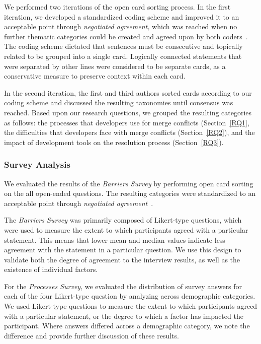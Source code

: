 We performed two iterations of the open card sorting process.
In the first iteration, we developed a standardized coding scheme and improved it to an acceptable point through \textit{negotiated agreement,} which was reached when no further thematic categories could be created and agreed upon by both coders~\cite{garrison2006revisiting,ritchie2013qualitative}.
The coding scheme dictated that sentences must be consecutive and topically related to be grouped into a single card.
Logically connected statements that were separated by other lines were considered to be separate cards, as a conservative measure to preserve context within each card.

In the second iteration, the first and third authors sorted cards according to our coding scheme and discussed the resulting taxonomies until consensus was reached.
Based upon our research questions, we grouped the resulting categories as follows: the processes that developers use for merge conflicts (Section~\ref{RQ1}, the difficulties that developers face with merge conflicts (Section~\ref{RQ2}), and the impact of development tools on the resolution process (Section~\ref{RQ3}).

\subsubsection{Survey Analysis}

We evaluated the results of the \textit{Barriers Survey} by performing open card sorting on the all open-ended questions.
The resulting categories were standardized to an acceptable point through \textit{negotiated agreement}~\cite{ritchie2013qualitative}.

The \textit{Barriers Survey} was primarily composed of Likert-type questions, which were used to measure the extent to which participants agreed with a particular statement.
This means that lower mean and median values indicate less agreement with the statement in a particular question.
We use this design to validate both the degree of agreement to the interview results, as well as the existence of individual factors.

For the \textit{Processes Survey}, we evaluated the distribution of survey answers for each of the four Likert-type question by analyzing across demographic categories.
We used Likert-type questions to measure the extent to which participants agreed with a particular statement, or the degree to which a factor has impacted the participant.
Where answers differed across a demographic category, we note the difference and provide further discussion of these results.

